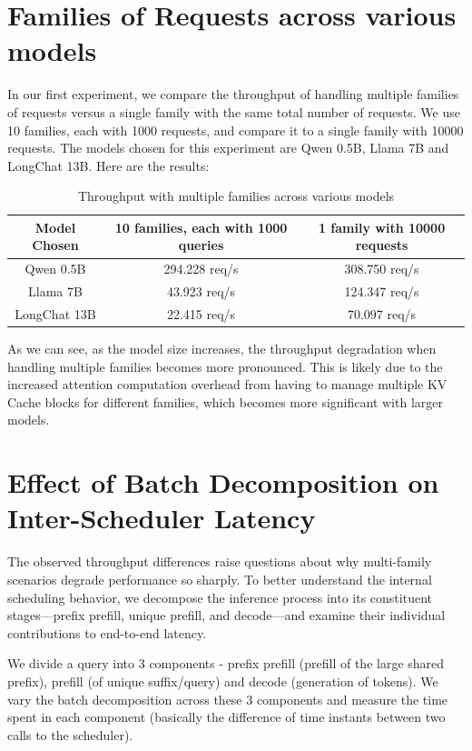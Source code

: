 \section{Families of Requests across various models}
In our first experiment, we compare the throughput of handling multiple families of requests versus a single family with the same total number of requests. We use 10 families, each with 1000 requests, and compare it to a single family with 10000 requests. The models chosen for this experiment are Qwen 0.5B, Llama 7B and LongChat 13B. Here are the results:
\begin{table}[h!]
\centering
\begin{tabular}{|c||c|c|}
\hline
\textbf{Model Chosen} & \textbf{10 families, each with 1000 queries} & \textbf{1 family with 10000 requests} \\
\hline
\hline
Qwen 0.5B & 294.228 req/s &  308.750 req/s\\
\hline
Llama 7B & 43.923 req/s&  124.347 req/s\\
\hline
LongChat 13B & 22.415 req/s& 70.097 req/s\\
\hline
\end{tabular}
\caption{Throughput with multiple families across various models}
\end{table}


As we can see, as the model size increases, the throughput degradation when handling multiple families becomes more pronounced. This is likely due to the increased attention computation overhead from having to manage multiple KV Cache blocks for different families, which becomes more significant with larger models.


\section{Effect of Batch Decomposition on Inter-Scheduler Latency}
The observed throughput differences raise questions about why multi-family scenarios degrade performance so sharply. To better understand the internal scheduling behavior, we decompose the inference process into its constituent stages—prefix prefill, unique prefill, and decode—and examine their individual contributions to end-to-end latency.

We divide a query into 3 components - prefix prefill (prefill of the large shared prefix), prefill (of unique suffix/query) and decode (generation of tokens). We vary the batch decomposition across these 3 components and measure the time spent in each component (basically the difference of time instants between two calls to the scheduler).

